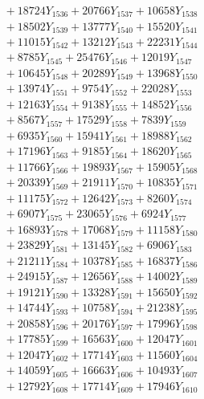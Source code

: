 \documentclass[a4paper,10pt]{article}
\begin{document}
{\begin{align}
&\;  + 18724 Y_{1536} + 20766 Y_{1537} + 10658 Y_{1538} \\[0.3ex]
&\;  + 18502 Y_{1539} + 13777 Y_{1540} + 15520 Y_{1541} \\[0.3ex]
&\;  + 11015 Y_{1542} + 13212 Y_{1543} + 22231 Y_{1544} \\[0.3ex]
&\;  + 8785 Y_{1545} + 25476 Y_{1546} + 12019 Y_{1547} \\[0.3ex]
&\;  + 10645 Y_{1548} + 20289 Y_{1549} + 13968 Y_{1550} \\[0.3ex]
&\;  + 13974 Y_{1551} + 9754 Y_{1552} + 22028 Y_{1553} \\[0.3ex]
&\;  + 12163 Y_{1554} + 9138 Y_{1555} + 14852 Y_{1556} \\[0.3ex]
&\;  + 8567 Y_{1557} + 17529 Y_{1558} + 7839 Y_{1559} \\[0.5ex]\allowbreak
&\;  + 6935 Y_{1560} + 15941 Y_{1561} + 18988 Y_{1562} \\[0.3ex]
&\;  + 17196 Y_{1563} + 9185 Y_{1564} + 18620 Y_{1565} \\[0.3ex]
&\;  + 11766 Y_{1566} + 19893 Y_{1567} + 15905 Y_{1568} \\[0.3ex]
&\;  + 20339 Y_{1569} + 21911 Y_{1570} + 10835 Y_{1571} \\[0.3ex]
&\;  + 11175 Y_{1572} + 12642 Y_{1573} + 8260 Y_{1574} \\[0.3ex]
&\;  + 6907 Y_{1575} + 23065 Y_{1576} + 6924 Y_{1577} \\[0.3ex]
&\;  + 16893 Y_{1578} + 17068 Y_{1579} + 11158 Y_{1580} \\[0.3ex]
&\;  + 23829 Y_{1581} + 13145 Y_{1582} + 6906 Y_{1583} \\[0.3ex]
&\;  + 21211 Y_{1584} + 10378 Y_{1585} + 16837 Y_{1586} \\[0.3ex]
&\;  + 24915 Y_{1587} + 12656 Y_{1588} + 14002 Y_{1589} \\[0.5ex]\allowbreak
&\;  + 19121 Y_{1590} + 13328 Y_{1591} + 15650 Y_{1592} \\[0.3ex]
&\;  + 14744 Y_{1593} + 10758 Y_{1594} + 21238 Y_{1595} \\[0.3ex]
&\;  + 20858 Y_{1596} + 20176 Y_{1597} + 17996 Y_{1598} \\[0.3ex]
&\;  + 17785 Y_{1599} + 16563 Y_{1600} + 12047 Y_{1601} \\[0.3ex]
&\;  + 12047 Y_{1602} + 17714 Y_{1603} + 11560 Y_{1604} \\[0.3ex]
&\;  + 14059 Y_{1605} + 16663 Y_{1606} + 10493 Y_{1607} \\[0.3ex]
&\;  + 12792 Y_{1608} + 17714 Y_{1609} + 17946 Y_{1610} \\[0.3ex]

\end{align}}
\end{document}

